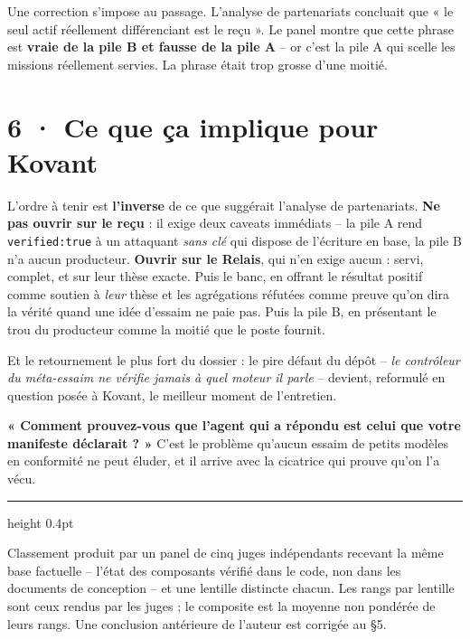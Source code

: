\documentclass[10pt]{article}
\newcommand{\code}[1]{\texttt{\small #1}}
\begin{document}
Une correction s'impose au passage. L'analyse de partenariats concluait que « le seul actif réellement
différenciant est le reçu ». Le panel montre que cette phrase est \textbf{vraie de la pile B et fausse
de la pile A} -- or c'est la pile A qui scelle les missions réellement servies. La phrase était trop
grosse d'une moitié.

\section{6 · Ce que ça implique pour Kovant}

L'ordre à tenir est \textbf{l'inverse} de ce que suggérait l'analyse de partenariats. \textbf{Ne pas
ouvrir sur le reçu} : il exige deux caveats immédiats -- la pile A rend \code{verified:true} à un
attaquant \emph{sans clé} qui dispose de l'écriture en base, la pile B n'a aucun producteur.
\textbf{Ouvrir sur le Relais}, qui n'en exige aucun : servi, complet, et sur leur thèse exacte. Puis le
banc, en offrant le résultat positif comme soutien à \emph{leur} thèse et les agrégations réfutées comme
preuve qu'on dira la vérité quand une idée d'essaim ne paie pas. Puis la pile B, en présentant le trou du
producteur comme la moitié que le poste fournit.

Et le retournement le plus fort du dossier : le pire défaut du dépôt -- \emph{le contrôleur du
méta-essaim ne vérifie jamais à quel moteur il parle} -- devient, reformulé en question posée à Kovant,
le meilleur moment de l'entretien.

\begin{cle}
\textbf{« Comment prouvez-vous que l'agent qui a répondu est celui que votre manifeste déclarait ? »}
C'est le problème qu'aucun essaim de petits modèles en conformité ne peut éluder, et il arrive avec la
cicatrice qui prouve qu'on l'a vécu.
\end{cle}

\vspace{3pt}
{\color{grey}\hrule height 0.4pt}
\vspace{2pt}
{\footnotesize\color{grey}Classement produit par un panel de cinq juges indépendants recevant la même
base factuelle -- l'état des composants vérifié dans le code, non dans les documents de conception -- et
une lentille distincte chacun. Les rangs par lentille sont ceux rendus par les juges ; le composite est
la moyenne non pondérée de leurs rangs. Une conclusion antérieure de l'auteur est corrigée au §5.}
\end{document}
